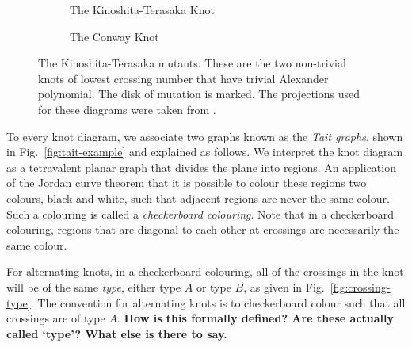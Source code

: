 \documentclass[12pt]{report}
\newcommand{\notered}[1]{{\color{Red} \textbf{#1}}}
\begin{document}
\begin{figure}[hbt!]
	\centering
	\hspace*{\fill}
	\begin{subfigure}[b]{0.4 \textwidth}
		\centering
		\def\svgscale{0.25}
		
		\caption{The Kinoshita-Terasaka Knot}
		\label{fig:kinoshita-terasaka-knot}
	\end{subfigure}
	\hspace*{\fill} \hspace*{\fill}	\hspace*{\fill}
	\begin{subfigure}[b]{0.4 \textwidth}
		\centering
		\def\svgscale{0.25}
		
		\caption{The Conway Knot}
		\label{fig:conway-knot}
	\end{subfigure}
	\hspace*{\fill} 
	\caption{The Kinoshita-Terasaka mutants. These are the two non-trivial knots of lowest crossing number that have trivial Alexander polynomial. The disk of mutation is marked. The projections used for these diagrams were taken from \cite[Fig.~2.32]{the-knot-book}.}
	\label{fig:kinoshita-terasaka-mutants}
\end{figure}

To every knot diagram, we associate two graphs known as the \textit{Tait graphs}, shown in Fig.~\ref{fig:tait-example} and explained as follows. We interpret the knot diagram as a tetravalent planar graph that divides the plane into regions. An application of the Jordan curve theorem that it is possible to colour these regions two colours, black and white, such that adjacent regions are never the same colour. Such a colouring is called a \textit{checkerboard colouring}. Note that in a checkerboard colouring, regions that are diagonal to each other at crossings are necessarily the same colour.

For alternating knots, in a checkerboard colouring, all of the crossings in the knot will be of the same \textit{type}, either type $A$ or type $B$, as given in Fig.~\ref{fig:crossing-type}. The convention for alternating knots is to checkerboard colour such that all crossings are of type $A$. \notered{How is this formally defined? Are these actually called `type'? What else is there to say.}
\end{document}
